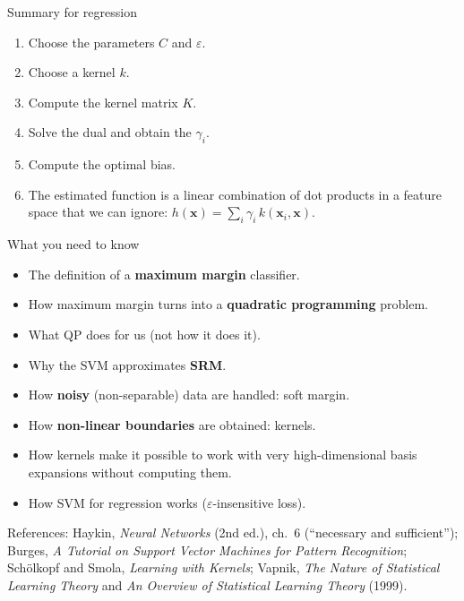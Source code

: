\begin{boxabstract}{Summary for regression}

\begin{enumerate}
\def\labelenumi{\arabic{enumi}.}
\tightlist
\item
  Choose the parameters \(C\) and \(\varepsilon\).
\item
  Choose a kernel \(k\).
\item
  Compute the kernel matrix \(K\).
\item
  Solve the dual and obtain the \(\gamma_i\).
\item
  Compute the optimal bias.
\item
  The estimated function is a linear combination of dot products in a
  feature space that we can ignore:
  \(h(\mathbf{x}) = \sum_i\gamma_i\,k(\mathbf{x}_i, \mathbf{x})\).
\end{enumerate}

\end{boxabstract}

\begin{boxquestion}{What you need to know}

\begin{itemize}
\tightlist
\item
  The definition of a \textbf{maximum margin} classifier.
\item
  How maximum margin turns into a \textbf{quadratic programming}
  problem.
\item
  What QP does for us (not how it does it).
\item
  Why the SVM approximates \textbf{SRM}.
\item
  How \textbf{noisy} (non-separable) data are handled: soft margin.
\item
  How \textbf{non-linear boundaries} are obtained: kernels.
\item
  How kernels make it possible to work with very high-dimensional basis
  expansions without computing them.
\item
  How SVM for regression works (\(\varepsilon\)-insensitive loss).
\end{itemize}

\end{boxquestion}

References: Haykin, \emph{Neural Networks} (2nd ed.), ch.\ 6
(``necessary and sufficient''); Burges, \emph{A Tutorial on Support
Vector Machines for Pattern Recognition}; Schölkopf and Smola,
\emph{Learning with Kernels}; Vapnik, \emph{The Nature of Statistical
Learning Theory} and \emph{An Overview of Statistical Learning Theory}
(1999).
